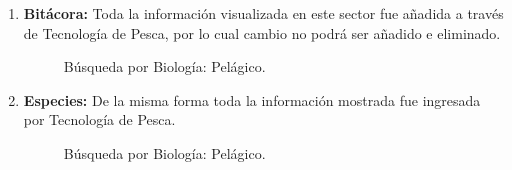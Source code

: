 \documentclass[a4paper,oneside,11pt]{book}
\begin{document}
\begin{itemize}
\begin{enumerate}
\item\textbf{ Bitácora:} Toda la información visualizada en este sector fue añadida a través de Tecnología de Pesca, por lo cual cambio no podrá ser añadido e eliminado.

\begin{figure} [!h]
\begin{center}
\caption{Búsqueda por Biología: Pelágico.}
\end{center}
\end{figure}


\item \textbf{Especies:} De la misma forma toda la información mostrada fue ingresada por Tecnología de Pesca.
   
\begin{figure} [!h]
\begin{center}
\caption{Búsqueda por Biología: Pelágico.}
\end{center}
\end{figure}


\end{enumerate}
\end{itemize}
\end{document}
